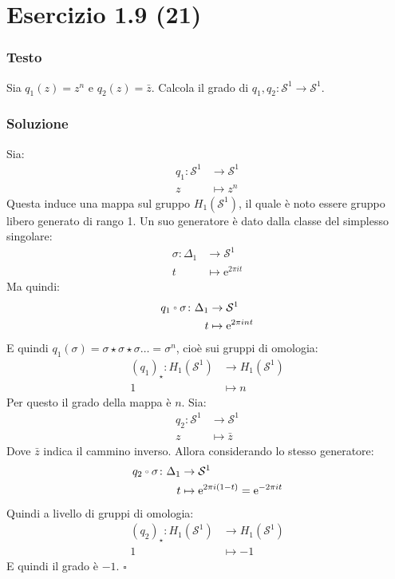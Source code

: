 \documentclass[10pt, toc=sectionentrywithdots]{scrartcl}
\newcommand{\Sph}[1][]{\mathcal{S}^#1}
\let\latexcirc=\circ
\newcommand{\ccirc}{\mathbin{\mathchoice
  {\xcirc\scriptstyle}
  {\xcirc\scriptstyle}
  {\xcirc\scriptscriptstyle}
  {\xcirc\scriptscriptstyle}
}}
\newcommand{\xcirc}[1]{\vcenter{\hbox{$#1\latexcirc$}}}
\let\circ\ccirc
\begin{document}
\section[1.9 (21)]{Esercizio 1.9 (21)}

\subsubsection*{Testo}

Sia $ q_1 (z) = z^n $ e $ q_2(z) = \bar{z} $. Calcola il grado di $ q_1, q_2 \colon \Sph{1} \to \Sph{1} $.

\subsubsection*{Soluzione}

Sia:
\begin{align*}
  q_1 \colon  \Sph{1} &\to \Sph{1} \\
  z & \mapsto z^n
\end{align*}
Questa induce una mappa sul gruppo $ H_1(\Sph{1}) $,
il quale è noto essere gruppo libero generato di rango 1.
Un suo generatore è dato dalla classe del simplesso
singolare:
\begin{align*}
  \sigma \colon \Delta_1 & \to \Sph{1} \\
  t & \mapsto \mathrm{e}^{2 \pi i t}
\end{align*}
Ma quindi:
\begin{align*}
  q_1 \circ \sigma \colon \Delta_1 & \to \Sph{1} \\
  t & \mapsto \mathrm{e}^{2 \pi i n t}
\end{align*}
E quindi $ q_1(\sigma) = \sigma \star \sigma \star \sigma \dots = \sigma^n $, cioè sui gruppi
di omologia:
\begin{align*}
  (q_1)_\star \colon H_1(\Sph{1}) & \to H_1(\Sph{1}) \\
  1 & \mapsto n
\end{align*}
Per questo il grado della mappa è $ n $.
Sia:
\begin{align*}
  q_2 \colon  \Sph{1} & \to \Sph{1} \\
  z & \mapsto \bar{z}
\end{align*}
Dove $ \bar{z} $ indica il cammino inverso. Allora
considerando lo stesso generatore:
\begin{align*}
  q_2 \circ \sigma \colon  \Delta_1 & \to \Sph{1} \\
  t & \mapsto \mathrm{e}^{2 \pi i (1 - t)} = \mathrm{e}^{-2 \pi i t}
\end{align*}
Quindi a livello di gruppi di omologia:
\begin{align*}
  (q_2)_\star \colon H_1(\Sph{1}) & \to H_1(\Sph{1}) \\
  1 & \mapsto -1
\end{align*}
E quindi il grado è $ -1 $.
\hfill $ \square $
\end{document}
